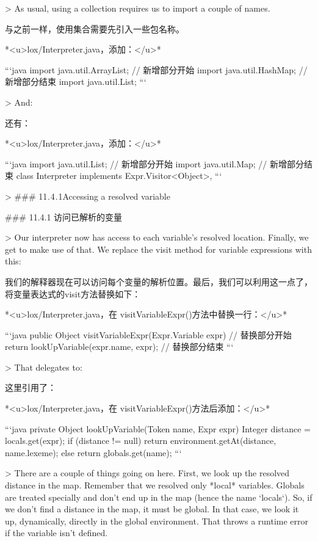 \documentclass[cn,11pt,chinese]{elegantbook}
\begin{document}
{{{{{{{{{{{{{{> As usual, using a collection requires us to import a couple of names.

与之前一样，使用集合需要先引入一些包名称。

*<u>lox/Interpreter.java，添加：</u>*

```java
import java.util.ArrayList;
// 新增部分开始
import java.util.HashMap;
// 新增部分结束
import java.util.List;
```

> And:

还有：

*<u>lox/Interpreter.java，添加：</u>*

```java
import java.util.List;
// 新增部分开始
import java.util.Map;
// 新增部分结束
class Interpreter implements Expr.Visitor<Object>,
```

> ### 11 . 4 . 1Accessing a resolved variable

### 11.4.1 访问已解析的变量

> Our interpreter now has access to each variable’s resolved location. Finally, we get to make use of that. We replace the visit method for variable expressions with this:

我们的解释器现在可以访问每个变量的解析位置。最后，我们可以利用这一点了，将变量表达式的visit方法替换如下：

*<u>lox/Interpreter.java，在 visitVariableExpr()方法中替换一行：</u>*

```java
  public Object visitVariableExpr(Expr.Variable expr) {
    // 替换部分开始
    return lookUpVariable(expr.name, expr);
    // 替换部分结束
  }
```

> That delegates to:

这里引用了：

*<u>lox/Interpreter.java，在 visitVariableExpr()方法后添加：</u>*

```java
  private Object lookUpVariable(Token name, Expr expr) {
    Integer distance = locals.get(expr);
    if (distance != null) {
      return environment.getAt(distance, name.lexeme);
    } else {
      return globals.get(name);
    }
  }
```

> There are a couple of things going on here. First, we look up the resolved distance in the map. Remember that we resolved only *local* variables. Globals are treated specially and don’t end up in the map (hence the name `locals`). So, if we don’t find a distance in the map, it must be global. In that case, we look it up, dynamically, directly in the global environment. That throws a runtime error if the variable isn’t defined.

}}}}}}}}}}}}}}
\end{document}
